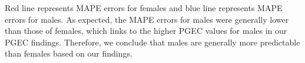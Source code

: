 \documentclass{article}
\begin{document}
Red line represents MAPE errors for females and blue line represents MAPE errors for males. As expected, the MAPE errors for males were generally lower than those of females, which links to the higher PGEC values for males in our PGEC findings. Therefore, we conclude that males are generally more predictable than females based on our findings.
\end{document}
